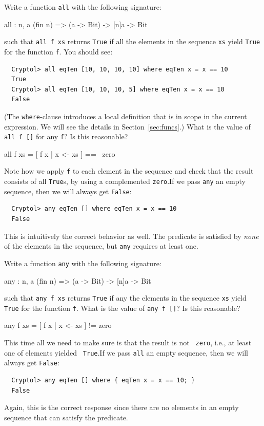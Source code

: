 \begin{Exercise}\label{ex:zero:1}
Write a function {\tt all} with the following signature:\indAll
\begin{code}
  all : {n, a} (fin n) => (a -> Bit) -> [n]a -> Bit
\end{code}
such that {\tt all f xs} returns {\tt True} if all the elements in the
sequence {\tt xs} yield {\tt True} for the function {\tt f}.
 You should see:
\begin{Verbatim}
  Cryptol> all eqTen [10, 10, 10, 10] where eqTen x = x == 10
  True
  Cryptol> all eqTen [10, 10, 10, 5] where eqTen x = x == 10
  False
\end{Verbatim}
(The {\tt where}-clause introduces a local definition that is in scope
in the current expression. We will see the details in
Section~\ref{sec:funcs}.\indWhere) What is the value of {\tt all f []}
for any {\tt f}? Is this reasonable?
\end{Exercise}
\begin{Answer}
\begin{code}
  all f xs = [ f x | x <- xs ] == ~zero
\end{code}
Note how we apply {\tt f} to each element in the sequence and check
that the result consists of all {\tt True}s, by using a complemented
{\tt zero}.\indZero\indAll If we pass {\tt any} an empty sequence,
then we will always get {\tt False}:
\begin{Verbatim}
  Cryptol> any eqTen [] where eqTen x = x == 10
  False
\end{Verbatim}
This is intuitively the correct behavior as well. The predicate is
satisfied by {\em none} of the elements in the sequence, but {\tt any}
requires at least one.
\end{Answer}

\begin{Exercise}\label{ex:zero:2}
Write a function {\tt any} with the following signature:\indAny
\begin{code}
  any : {n, a} (fin n) => (a -> Bit) -> [n]a -> Bit
\end{code}
such that {\tt any f xs} returns {\tt True} if any the elements in the
sequence {\tt xs} yield {\tt True} for the function {\tt f}. What is
the value of {\tt any f []}? Is this reasonable?
\end{Exercise}
\begin{Answer}
\begin{code}
  any f xs = [ f x | x <- xs ] != zero
\end{code}
This time all we need to make sure is that the result is not {\tt
  zero}, i.e., at least one of elements yielded {\tt
  True}.\indZero\indTrue\indAny If we pass {\tt all} an empty
sequence, then we will always get {\tt False}:
\begin{Verbatim}
  Cryptol> any eqTen [] where { eqTen x = x == 10; }
  False
\end{Verbatim}
Again, this is the correct response since there are no elements in an
empty sequence that can satisfy the predicate.
\end{Answer}

